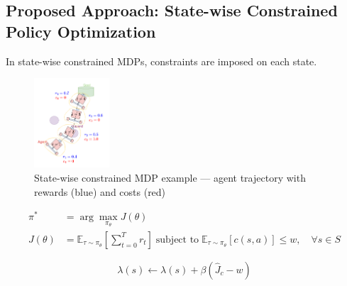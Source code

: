 \documentclass[8pt, aspectratio=169]{beamer} %
\begin{document}

\subsection{Proposed Approach: State-wise Constrained Policy Optimization}

\begin{frame}{\insertsubsectionhead}

  In state-wise constrained MDPs, constraints are imposed on each state.

  \begin{figure}
    \includegraphics[width=0.25\textwidth]{figures/statewise-constrained-rl.pdf}
    \caption{State-wise constrained MDP example — agent trajectory with rewards (blue) and costs (red)}
  \end{figure}

\end{frame}

\begin{frame}{\insertsubsectionhead}

  \begin{equation}
    \begin{aligned}
      \pi^* &= \arg\max_{\pi_\theta} J(\theta) \\
      J(\theta) &= \mathbb{E}_{\tau \sim \pi_\theta} \left[ \sum^T_{t = 0} r_t \right] \; \text{subject to} \; \mathbb{E}_{\tau \sim \pi_\theta}  [c(s, a)] \leq w, \quad \forall s \in S
    \end{aligned}
  \end{equation}

  \begin{equation}
    \lambda(s) \leftarrow \lambda(s) + \beta(\hat{J}_c - w)
  \end{equation}

  \vspace{0.5cm}


\end{frame}
\end{document}
